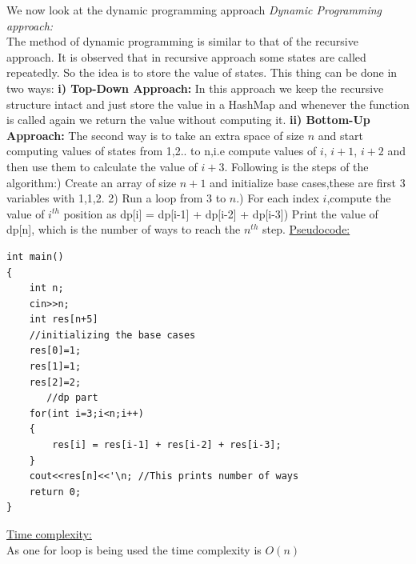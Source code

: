\documentclass[12pt]{book}
\begin{document}
We now look at the dynamic programming approach\newline\newline
\textit{Dynamic Programming approach:}\\
The method of dynamic programming is similar to that of the recursive approach. It is observed that in recursive approach some states are called repeatedly. So the idea is to store the value of states. This thing can be done in two ways:\newline\newline
\textbf{i) Top-Down Approach:} In this approach we keep the recursive structure intact and just store the value in a HashMap and whenever the function is called again we return the value without computing it.\newline\newline
\textbf{ii) Bottom-Up Approach:} The second way is to take an extra space of size $n$ and start computing values of states from 1,2.. to n,i.e compute values of $i$, $i+1$, $i+2$ and then use them to calculate the value of $i+3$.\newline\newline
Following is the steps of the algorithm:\newline{}) Create an array of size $n+1$ and initialize base cases,these are first 3 variables with 1,1,2\newline.
2) Run a loop from 3 to $n$.) For each index $i$,compute the value of $i^{th}$ position as dp[i]  = dp[i-1] + dp[i-2] + dp[i-3]) Print the value of dp[n], which is the number of ways to reach the $n^{th}$ step.\newline\newline
\underline{Pseudocode:}\\

\begin{lstlisting}
int main()
{
    int n;
    cin>>n;
    int res[n+5]
    //initializing the base cases
    res[0]=1;
    res[1]=1;
    res[2]=2;
       //dp part
    for(int i=3;i<n;i++)
    {
        res[i] = res[i-1] + res[i-2] + res[i-3];
    }
    cout<<res[n]<<'\n; //This prints number of ways
    return 0;
}
\end{lstlisting}

\underline{Time complexity:}\\
As one for loop is being used the time complexity is $O(n)$\\
\end{document}
